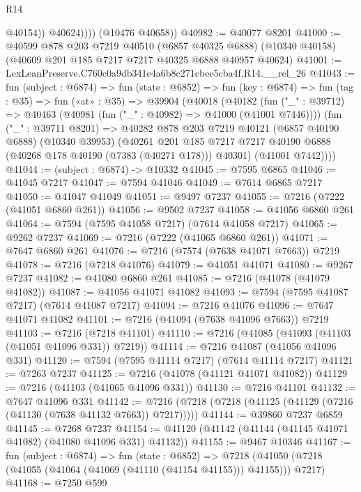 \begin{lexlean}{R14}
\begin{coremodule}
                  @40154))
              @40624))))
      (@10476 @40658))
@40982 := @40077 @8201
@41000 := @40599
    @878
    @203
    @7219
    @40510
    (@6857 @40325 @6888)
    (@10340 @40158)
    (@40609 @201 @185 @7217 @7217 @40325 @6888 @40957 @40624)
@41001 := LexLeanPreserve.C760c0a9db341e4a6b8c271cbee5cba4f.R14.__rel_26
@41043 := fun (subject : @6874) =>
  fun (state : @6852) =>
  fun (key : @6874) =>
  fun (tag : @35) =>
  fun («at» : @35) =>
  @39904
    (@40018
      (@40182
        (fun ("_" : @39712) => @40463 (@40981 (fun ("_" : @40982) => @41000 (@41001 @7446))))
        (fun ("_" : @39711 @8201) =>
        @40282
          @878
          @203
          @7219
          @40121
          (@6857 @40190 @6888)
          (@10340 @39953)
          (@40261
            @201
            @185
            @7217
            @7217
            @40190
            @6888
            (@40268 @178 @40190 (@7383 (@40271 @178)))
            @40301)
          (@41001 @7442))))
@41044 := (subject : @6874) -> @10332
@41045 := @7595 @6865
@41046 := @41045 @7217
@41047 := @7594 @41046
@41049 := @7614 @6865 @7217
@41050 := @41047 @41049
@41051 := @9497 @7237
@41055 := @7216 (@7222 (@41051 @6860 @261))
@41056 := @9502 @7237
@41058 := @41056 @6860 @261
@41064 := @7594 (@7595 @41058 @7217) (@7614 @41058 @7217)
@41065 := @9262 @7237
@41069 := @7216 (@7222 (@41065 @6860 @261))
@41071 := @7647 @6860 @261
@41076 := @7216 (@7574 (@7638 @41071 @7663)) @7219
@41078 := @7216 (@7218 @41076)
@41079 := @41051 @41071
@41080 := @9267 @7237
@41082 := @41080 @6860 @261
@41085 := @7216 (@41078 (@41079 @41082))
@41087 := @41056 @41071 @41082
@41093 := @7594 (@7595 @41087 @7217) (@7614 @41087 @7217)
@41094 := @7216 @41076
@41096 := @7647 @41071 @41082
@41101 := @7216 (@41094 (@7638 @41096 @7663)) @7219
@41103 := @7216 (@7218 @41101)
@41110 := @7216 (@41085 (@41093 (@41103 (@41051 @41096 @331)) @7219))
@41114 := @7216 @41087 (@41056 @41096 @331)
@41120 := @7594 (@7595 @41114 @7217) (@7614 @41114 @7217)
@41121 := @7263 @7237
@41125 := @7216 (@41078 (@41121 @41071 @41082))
@41129 := @7216 (@41103 (@41065 @41096 @331))
@41130 := @7216 @41101
@41132 := @7647 @41096 @331
@41142 := @7216 (@7218 (@7218 (@41125 (@41129 (@7216 (@41130 (@7638 @41132 @7663)) @7217)))))
@41144 := @39860 @7237 @6859
@41145 := @7268 @7237
@41154 := @41120 (@41142 (@41144 (@41145 @41071 @41082) (@41080 @41096 @331) @41132))
@41155 := @9467 @10346
@41167 := fun (subject : @6874) =>
  fun (state : @6852) =>
  @7218 (@41050 (@7218 (@41055 (@41064 (@41069 (@41110 (@41154 @41155))) @41155))) @7217)
@41168 := @7250 @599

\end{coremodule}
\end{lexlean}

